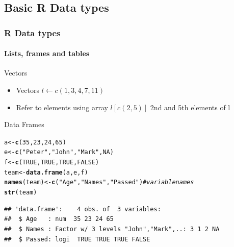 \documentclass[12pt]{beamer}\usepackage[]{graphicx}\usepackage[]{color}
\makeatletter
\newcommand{\hlnum}[1]{\textcolor[rgb]{0.686,0.059,0.569}{#1}}%
\newcommand{\hlstr}[1]{\textcolor[rgb]{0.192,0.494,0.8}{#1}}%
\newcommand{\hlcom}[1]{\textcolor[rgb]{0.678,0.584,0.686}{\textit{#1}}}%
\newcommand{\hlstd}[1]{\textcolor[rgb]{0.345,0.345,0.345}{#1}}%
\newcommand{\hlkwb}[1]{\textcolor[rgb]{0.69,0.353,0.396}{#1}}%
\newcommand{\hlkwd}[1]{\textcolor[rgb]{0.737,0.353,0.396}{\textbf{#1}}}%
\newenvironment{kframe}{%
 \def\at@end@of@kframe{}%
 \ifinner\ifhmode%
  \def\at@end@of@kframe{\end{minipage}}%
  \begin{minipage}{\columnwidth}%
 \fi\fi%
 \def\FrameCommand##1{\hskip\@totalleftmargin \hskip-\fboxsep
 \colorbox{shadecolor}{##1}\hskip-\fboxsep
     \hskip-\linewidth \hskip-\@totalleftmargin \hskip\columnwidth}%
 \MakeFramed {\advance\hsize-\width
   \@totalleftmargin\z@ \linewidth\hsize
   \@setminipage}}%
 {\par\unskip\endMakeFramed%
 \at@end@of@kframe}
\newenvironment{knitrout}{}{} %
\makeatother
\begin{document}
\subsection*{Basic R Data types}
\begin{frame}[fragile]
  \frametitle{R Data types}
  \framesubtitle{Lists, frames and tables}
  \begin{block}{Vectors}
      \begin{itemize}
         \item  Vectors $l\leftarrow c(1,3,4,7,11)$
         \item  Refer to elements using array $l[c(2,5)]$ 2nd and 5th elements of l
    \end{itemize}
  \end{block}
  \begin{block}{Data Frames}
 \end{block} 
\begin{knitrout}
\color{fgcolor}\begin{kframe}
\begin{alltt}
\hlstd{a} \hlkwb{<-} \hlkwd{c}\hlstd{(}\hlnum{35}\hlstd{,}\hlnum{23}\hlstd{,}\hlnum{24}\hlstd{,}\hlnum{65}\hlstd{)}
\hlstd{e} \hlkwb{<-} \hlkwd{c}\hlstd{(}\hlstr{"Peter"}\hlstd{,} \hlstr{"John"}\hlstd{,} \hlstr{"Mark"}\hlstd{,} \hlnum{NA}\hlstd{)}
\hlstd{f} \hlkwb{<-} \hlkwd{c}\hlstd{(}\hlnum{TRUE}\hlstd{,}\hlnum{TRUE}\hlstd{,}\hlnum{TRUE}\hlstd{,}\hlnum{FALSE}\hlstd{)}
\hlstd{team} \hlkwb{<-} \hlkwd{data.frame}\hlstd{(a,e,f)}
\hlkwd{names}\hlstd{(team)} \hlkwb{<-} \hlkwd{c}\hlstd{(}\hlstr{"Age"}\hlstd{,}\hlstr{"Names"}\hlstd{,}\hlstr{"Passed"}\hlstd{)} \hlcom{# variable names}
\hlkwd{str}\hlstd{(team)}
\end{alltt}
\begin{verbatim}
## 'data.frame':	4 obs. of  3 variables:
##  $ Age   : num  35 23 24 65
##  $ Names : Factor w/ 3 levels "John","Mark",..: 3 1 2 NA
##  $ Passed: logi  TRUE TRUE TRUE FALSE
\end{verbatim}
\end{kframe}
\end{knitrout}
 
\end{frame}  
\end{document}
